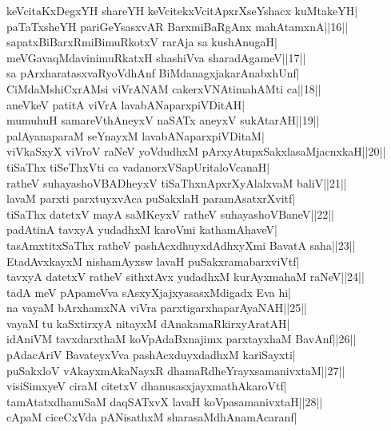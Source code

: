 \documentclass{article}
\begin{document}
keVcitaKxDegxYH shareYH keVcitekxVcitApxrXseYshacx kuMtakeYH|\\
paTaTxsheYH pariGeYsasxvAR BarxmiBaRgAnx mahAtamxnA||16||\\
sapatxBiBarxRmiBimuRkotxV rarAja sa kushAnugaH|\\
meVGavaqMdavinimuRkatxH shashiVva sharadAgameV||17||\\
sa pArxharatasxvaRyoVdhAnf BiMdanagxjakarAnabxhUnf|\\
CiMdaMshiCxrAMsi viVrANAM cakerxVNAtimahAMti ca||18||\\
aneVkeV patitA viVrA lavabANaparxpiVDitAH|\\
mumuhuH samareVthAneyxV naSATx aneyxV sukAtarAH||19||\\
palAyanaparaM seYnayxM lavabANaparxpiVDitaM|\\
viVkaSxyX viVroV raNeV yoVdudhxM pArxyAtupxSakxlasaMjacnxkaH||20||\\
tiSaThx tiSeThxVti ca vadanorxVSapUritaloVcanaH|\\
ratheV suhayashoVBADheyxV tiSaThxnApxrXyAlalxvaM baliV||21||\\
lavaM parxti parxtuyxvAca puSakxlaH paramAsatxrXvitf|\\
tiSaThx datetxV mayA saMKeyxV ratheV suhayashoVBaneV||22||\\
padAtinA tavxyA yudadhxM      karoVmi kathamAhaveV|\\
tasAmxtitxSaThx ratheV pashAcxdhuyxdAdhxyXmi BavatA saha||23||\\
EtadAvxkayxM nishamAyxsw lavaH puSakxramabarxviVtf|\\
tavxyA datetxV ratheV sithxtAvx yudadhxM kurAyxmahaM raNeV||24||\\
tadA meV pApameVva sAsxyXjajxyasasxMdigadx Eva hi|\\
na vayaM bArxhamxNA viVra parxtigarxhaparAyaNAH||25||\\
vayaM tu kaSxtirxyA nitayxM dAnakamaRkirxyAratAH|\\
idAniVM tavxdarxthaM koVpAdaBxnajimx parxtayxhaM BavAnf||26||\\
pAdacAriV BavateyxVva pashAcxduyxdadhxM kariSayxti|\\
puSakxloV vAkayxmAkaNayxR dhamaRdheYrayxsamanivxtaM||27||\\
visiSimxyeV ciraM citetxV dhanusasxjayxmathAkaroVtf|\\
tamAtatxdhanuSaM daqSATxvX lavaH koVpasamanivxtaH||28||\\
cApaM ciceCxVda pANisathxM sharasaMdhAnamAcaranf|\\
\end{document}
